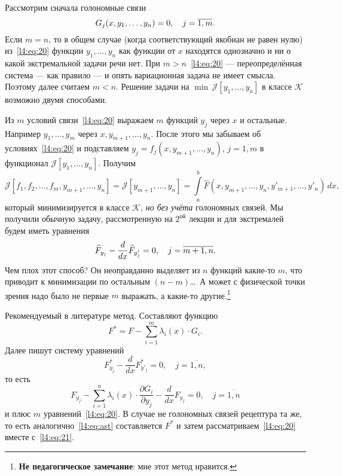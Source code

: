 \documentclass[12pt,a4paper,openany,fleqn]{book}
\newcommand{\J}{\ensuremath{\mathcal{J}}}
\newcommand{\mc}[1]{\ensuremath{\mathcal{#1}}}
\newcommand{\der}[2]{\ensuremath{\frac{d#1}{d#2}}}
\newcommand{\pder}[2]{\ensuremath{\frac{\partial#1}{\partial#2}}}
\newcommand{\K}{\mc{K}}
\theoremstyle{definition}
\begin{document}
\begin{enumerateD}
Рассмотрим сначала голономные связи
\begin{equation}
	\label{l4:eq:20}
	\hfill G_j(x,y_1,\ldots,y_n)=0,\quad j=\overline{1,m}.\hfill
\end{equation}
Если $m=n$, то в общем случае (когда соответствующий якобиан не равен нулю) из~\eqref{l4:eq:20} функции $y_1,\ldots,y_n$ как функции от $x$ находятся однозначно и ни о какой экстремальной задачи речи нет. При $m>n$~\eqref{l4:eq:20} --- переопределённая система --- как правило --- и опять вариационная задача не имеет смысла. Поэтому далее считаем $m<n$. Решение задачи на $\min\,\J[y_1,\ldots,y_n]$ в классе $\K$ возможно двумя способами. 
\begin{enumerateD}
	\item Из $m$ условий связи~\eqref{l4:eq:20} выражаем $m$ функций $y_j$ через $x$ и остальные. Например $y_1,\ldots,y_m$ через $x,y_{m+1},\ldots,y_n$. После этого мы забываем об условиях~\eqref{l4:eq:20} и подставляем $y_j=f_j(x,y_{m+1},\ldots,y_{n})$, $j=\overline{1,m}$ в функционал $\J[y_1,\ldots,y_n]$. Получим
	\begin{equation*}
		\J[f_1,f_2,\ldots,f_m,y_{m+1},\ldots,y_n]=\widehat{\J}[y_{m+1},\ldots,y_n]=\int\limits_a^b \widehat{F}(x,y_{m+1},\ldots,y_n,y'_{m+1},\ldots,y'_n)\,dx,
	\end{equation*}  
	который минимизируется в классе $\K$, \emph{но без учёта} голономных связей. Мы получили обычную задачу, рассмотренную на $2^{\text{ой}}$ лекции и для экстремалей будем иметь уравнения
	\begin{equation*}
		\hfill \widehat{F}_{y_j}-\der{}{x}\widehat{F}_{y'_j}=0,\quad j=\overline{m+1,n}.\hfill
	\end{equation*} 
	Чем плох этот способ? Он неоправданно выделяет из $n$ функций какие-то $m$, что приводит к минимизации по остальным $(n-m)$\dots\  А может с физической точки зрения надо было не первые $m$ выражать, а какие-то другие.\footnote{\textbf{Не педагогическое замечание}: мне этот метод нравится.}
	\item Рекомендуемый в литературе метод. Составляют функцию
	\begin{equation}
		\label{l4:eq:ast}
		F^{\ast}=F-\sum\limits_{i=1}^{m}\lambda_i(x)\cdot G_i.\tag{$\ast$}
	\end{equation} 
	Далее пишут систему уравнений
	\begin{equation}
		\label{l4:eq:21}
		F^{\ast}_{y_j}-\der{}{x}F^{\ast}_{y'_j}=0,\quad j=\overline{1,n},
	\end{equation}
	то есть 
	\begin{equation*}
		F_{y_j}-\sum\limits_{i=1}^n\lambda_i(x)\cdot\pder{G_i}{y_j}-\der{}{x}F_{y_j}=0,\quad j=\overline{1,n}
	\end{equation*}
	и плюс $m$ уравнений~\eqref{l4:eq:20}.
	В случае не голономных связей рецептура та же, то есть аналогично~\eqref{l4:eq:ast} составляется $	F^{\ast}$ и затем рассматриваем~\eqref{l4:eq:20} вместе с~\eqref{l4:eq:21}.
\end{enumerateD}
\end{enumerateD}
\end{document}
